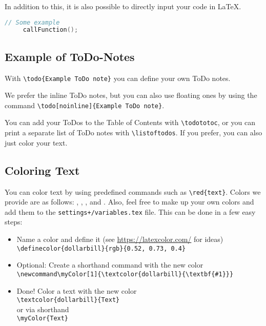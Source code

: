 \documentclass[class=scrbook, crop=false]{standalone}
\begin{document}
    In addition to this, it is also possible to directly input your code in \LaTeX.
    \begin{lstlisting}[language=C++,
                       caption=Another Descriptive Caption Text,
                       label=Code:Super Code2]
     // Some example
     callFunction();
    \end{lstlisting}

    \subsection{Example of ToDo-Notes}
    \label{Section::ToDo}
    With \verb|\todo{Example ToDo note}| you can define your own ToDo notes.

    We prefer the inline ToDo notes, but you can also use floating ones by using the command \verb|\todo[noinline]{Example ToDo note}|.

    You can add your ToDos to the Table of Contents with \verb|\todototoc|, or you can print a separate list of ToDo notes with \verb|\listoftodos|.
    If you prefer, you can also just color your text.

    \subsection{Coloring Text}
    \label{Section::Colors}
    You can color text by using predefined commands such as \verb|\red{text}|.
    Colors we provide are as follows: , , , and . Also, feel free to make up your own colors and add them to the \verb|settings+/variables.tex| file. This can be done in a few easy steps:
    \begin{itemize}
        \item Name a color and define it (see \url{https://latexcolor.com/} for ideas)\\
              \verb|\definecolor{dollarbill}{rgb}{0.52, 0.73, 0.4}|
        \item Optional: Create a shorthand command with the new color\\
              \verb|\newcommand\myColor[1]{\textcolor{dollarbill}{\textbf{#1}}}|
        \item Done! Color a text with the new color\\
              \verb|\textcolor{dollarbill}{Text}|\\
              or via shorthand\\
              \verb|\myColor{Text}|
    \end{itemize}
\end{document}
